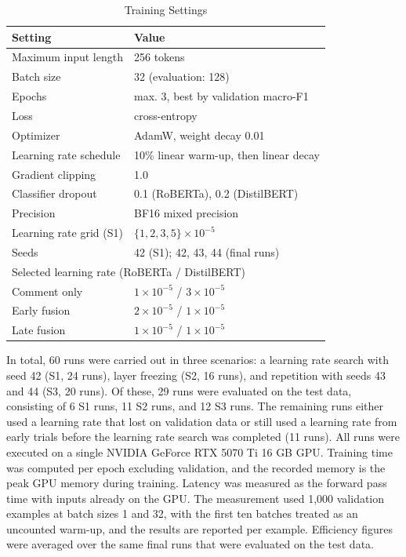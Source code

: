 \documentclass[conference]{IEEEtran}
\begin{document}
\begin{table}[t]
\caption{Training Settings}
\label{tab:setup}
\centering
\begin{tabular}{ll}
\hline
Setting & Value \\
\hline
Maximum input length & 256 tokens \\
Batch size & 32 (evaluation: 128) \\
Epochs & max. 3, best by validation macro-F1 \\
Loss & cross-entropy \\
Optimizer & AdamW, weight decay 0.01 \\
Learning rate schedule & 10\% linear warm-up, then linear decay \\
Gradient clipping & 1.0 \\
Classifier dropout & 0.1 (RoBERTa), 0.2 (DistilBERT) \\
Precision & BF16 mixed precision \\
Learning rate grid (S1) & $\{1, 2, 3, 5\} \times 10^{-5}$ \\
Seeds & 42 (S1); 42, 43, 44 (final runs) \\
\hline
\multicolumn{2}{l}{Selected learning rate (RoBERTa / DistilBERT)} \\
\quad Comment only & $1 \times 10^{-5}$ / $3 \times 10^{-5}$ \\
\quad Early fusion & $2 \times 10^{-5}$ / $1 \times 10^{-5}$ \\
\quad Late fusion & $1 \times 10^{-5}$ / $1 \times 10^{-5}$ \\
\hline
\end{tabular}
\end{table}

In total, 60 runs were carried out in three scenarios: a learning rate search with seed 42 (S1, 24 runs), layer freezing (S2, 16 runs), and repetition with seeds 43 and 44 (S3, 20 runs). Of these, 29 runs were evaluated on the test data, consisting of 6 S1 runs, 11 S2 runs, and 12 S3 runs. The remaining runs either used a learning rate that lost on validation data or still used a learning rate from early trials before the learning rate search was completed (11 runs). All runs were executed on a single NVIDIA GeForce RTX 5070 Ti 16 GB GPU. Training time was computed per epoch excluding validation, and the recorded memory is the peak GPU memory during training. Latency was measured as the forward pass time with inputs already on the GPU. The measurement used 1,000 validation examples at batch sizes 1 and 32, with the first ten batches treated as an uncounted warm-up, and the results are reported per example. Efficiency figures were averaged over the same final runs that were evaluated on the test data.
\end{document}
